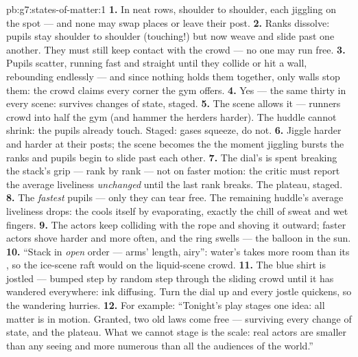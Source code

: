 \begin{solution}{pb:g7:states-of-matter:1}
\textbf{1.} In neat rows, shoulder to shoulder, each jiggling on
the spot --- and none may swap places or leave their post.
\textbf{2.} Ranks dissolve: pupils stay shoulder to shoulder
(touching!) but now weave and slide past one another. They must
still keep contact with the crowd --- no one may run free.
\textbf{3.} Pupils scatter, running fast and straight until they
collide or hit a wall, rebounding endlessly --- and since nothing
holds them together, only walls stop them: the crowd claims every
corner the gym offers.
\textbf{4.} Yes --- the same thirty in every scene:  survives
changes of state, staged.
\textbf{5.} The  scene allows it --- runners crowd into half
the gym (and hammer the herders harder). The  huddle cannot
shrink: the pupils already touch. Staged: gases squeeze, 
do not.
\textbf{6.} Jiggle harder and harder at their posts; the scene
becomes the  the moment jiggling bursts the ranks and
pupils begin to slide past each other.
\textbf{7.} The dial's  is spent breaking the stack's grip
--- rank by rank --- not on faster motion: the  critic
must report the average liveliness \emph{unchanged} until the
last rank breaks. The plateau, staged.
\textbf{8.} The \emph{fastest} pupils --- only they can tear
free. The remaining huddle's average liveliness drops: the
 cools itself by evaporating, exactly the chill of sweat
and wet fingers.
\textbf{9.} The actors keep colliding with the rope and shoving
it outward; faster actors shove harder and more often, and the
ring swells --- the balloon in the sun.
\textbf{10.} ``Stack in \emph{open} order --- arms' length,
airy'': water's  takes more room than its , so the
ice-scene raft would  on the liquid-scene crowd.
\textbf{11.} The blue shirt is jostled --- bumped step by random
step through the sliding crowd until it has wandered everywhere:
ink diffusing. Turn the dial up and every jostle quickens, so the
wandering hurries.
\textbf{12.} For example: ``Tonight's play stages one idea: all
matter is  in motion. Granted, two old laws come free
---  surviving every change of state, and the 
plateau. What we cannot stage is the scale: real actors are
smaller than any seeing and more numerous than all the audiences
of the world.''
\end{solution}
